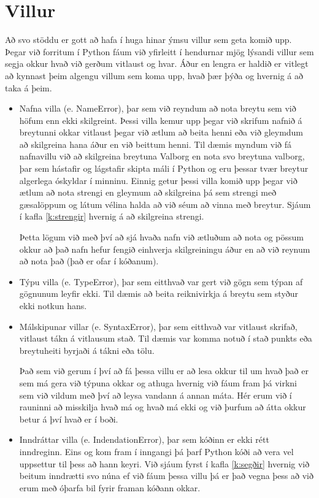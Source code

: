 \section{Villur}\label{uk:villur}
Að svo stöddu er gott að hafa í huga hinar ýmsu villur sem geta komið upp.
Þegar við forritum í Python fáum við yfirleitt í hendurnar mjög lýsandi villur sem segja okkur hvað við gerðum vitlaust og hvar.
Áður en lengra er haldið er vitlegt að kynnast þeim algengu villum sem koma upp, hvað þær þýða og hvernig á að taka á þeim.

\begin{itemize}
	\item Nafna villa (e. NameError), þar sem við reyndum að nota breytu sem við höfum enn ekki skilgreint.
	Þessi villa kemur upp þegar við skrifum nafnið á breytunni okkar vitlaust þegar við ætlum að beita henni eða við gleymdum að skilgreina hana áður en við beittum henni.
	Til dæmis myndum við fá nafnavillu við að skilgreina breytuna Valborg en nota svo breytuna valborg, þar sem hástafir og lágstafir skipta máli í Python og eru þessar tvær breytur algerlega óskyldar í minninu.
	Einnig getur þessi villa komið upp þegar við ætlum að nota strengi en gleymum að skilgreina þá sem strengi með gæsalöppum og látum vélina halda að við séum að vinna með breytur.
	Sjáum í kafla \ref{k:strengir} hvernig á að skilgreina strengi.
	
	Þetta lögum við með því að sjá hvaða nafn við ætluðum að nota og pössum okkur að það nafn hefur fengið einhverja skilgreiningu áður en að við reynum að nota það (það er ofar í kóðanum).
	
	\item Týpu villa (e. TypeError), þar sem eitthvað var gert við gögn sem týpan af gögnunum leyfir ekki.
	Til dæmis að beita reiknivirkja á breytu sem styður ekki notkun hans.
	\item Málskipunar villar (e. SyntaxError), þar sem eitthvað var vitlaust skrifað, vitlaust tákn á vitlausum stað.
	Til dæmis var komma notuð í stað punkts eða breytuheiti byrjaði á tákni eða tölu.
	
	Það sem við gerum í því að fá þessa villu er að lesa okkur til um hvað það er sem má gera við týpuna okkar og athuga hvernig við fáum fram þá virkni sem við vildum með því að leysa vandann á annan máta.
	Hér erum við í rauninni að misskilja hvað má og hvað má ekki og við þurfum að átta okkur betur á því hvað er í boði.
	
	\item Inndráttar villa (e. IndendationError), þar sem kóðinn er ekki rétt inndreginn.
	Eins og kom fram í inngangi þá þarf Python kóði að vera vel uppsettur til þess að hann keyri.
	Við sjáum fyrst í kafla \ref{k:segðir} hvernig við beitum inndrætti svo núna ef við fáum þessa villu þá er það vegna þess að við erum með óþarfa bil fyrir framan kóðann okkar. 
	

\end{itemize}
